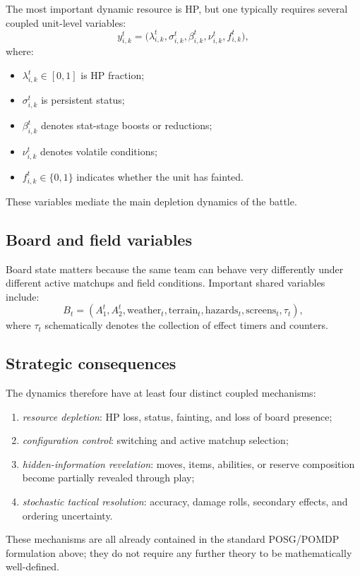 \documentclass[aps,pre,twocolumn,superscriptaddress,nofootinbib]{revtex4-2}
\theoremstyle{definition}
\theoremstyle{plain}
\begin{document}
The most important dynamic resource is HP, but one typically requires several coupled unit-level variables:
\begin{equation}
    y_{i,k}^t = \big(\lambda_{i,k}^t,\sigma_{i,k}^t,\beta_{i,k}^t,\nu_{i,k}^t,f_{i,k}^t\big),
\end{equation}
where:
\begin{itemize}
    \item $\lambda_{i,k}^t \in [0,1]$ is HP fraction;
    \item $\sigma_{i,k}^t$ is persistent status;
    \item $\beta_{i,k}^t$ denotes stat-stage boosts or reductions;
    \item $\nu_{i,k}^t$ denotes volatile conditions;
    \item $f_{i,k}^t \in \{0,1\}$ indicates whether the unit has fainted.
\end{itemize}

These variables mediate the main depletion dynamics of the battle.

\subsection{Board and field variables}

Board state matters because the same team can behave very differently under different active matchups and field conditions. Important shared variables include:
\begin{equation}
    B_t = (A_1^t,A_2^t,\mathrm{weather}_t,\mathrm{terrain}_t,\mathrm{hazards}_t,\mathrm{screens}_t,\tau_t),
\end{equation}
where $\tau_t$ schematically denotes the collection of effect timers and counters.

\subsection{Strategic consequences}

The dynamics therefore have at least four distinct coupled mechanisms:
\begin{enumerate}
    \item \emph{resource depletion}: HP loss, status, fainting, and loss of board presence;
    \item \emph{configuration control}: switching and active matchup selection;
    \item \emph{hidden-information revelation}: moves, items, abilities, or reserve composition become partially revealed through play;
    \item \emph{stochastic tactical resolution}: accuracy, damage rolls, secondary effects, and ordering uncertainty.
\end{enumerate}
These mechanisms are all already contained in the standard POSG/POMDP formulation above; they do not require any further theory to be mathematically well-defined.
\end{document}
